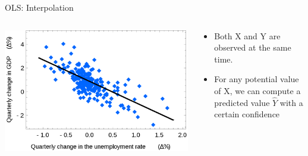 \documentclass{beamer}
\begin{document}
\begin{frame}{OLS: Interpolation}
    \begin{columns}
        \begin{column}{.5\textwidth}
        \centering
        \includegraphics[width=\textwidth]{static/course_2_img/OLS_Interpolation.png}
        \end{column}
        
        \begin{column}{.5\textwidth}
        \begin{itemize}
            \item Both X and Y are observed at the same time. 
            \item For any potential value of X, we can compute a predicted value $\hat{Y}$ with a certain confidence
        \end{itemize}
        \end{column}
    \end{columns}

\end{frame}
\end{document}
